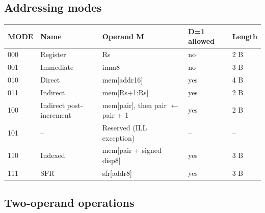 \subsection{Addressing modes}

\begin{center}
\small
\begin{tabularx}{\linewidth}{@{}l l X l l@{}}
  \toprule
  \textbf{MODE} & \textbf{Name} & \textbf{Operand M} & \textbf{D=1 allowed} & \textbf{Length} \\
  \midrule
  000 & Register              & Rs                                   & no  & 2 B \\
  001 & Immediate             & imm8                                 & no  & 3 B \\
  010 & Direct                & mem[addr16]                          & yes & 4 B \\
  011 & Indirect              & mem[Rs+1:Rs]                         & yes & 2 B \\
  100 & Indirect post-increment & mem[pair], then pair $\leftarrow$ pair + 1 & yes & 2 B \\
  101 & --                    & Reserved (ILL exception)             & --  & -- \\
  110 & Indexed               & mem[pair + signed disp8]             & yes & 3 B \\
  111 & SFR                   & sfr[addr8]                           & yes & 3 B \\
  \bottomrule
\end{tabularx}
\end{center}

\subsection{Two-operand operations}

